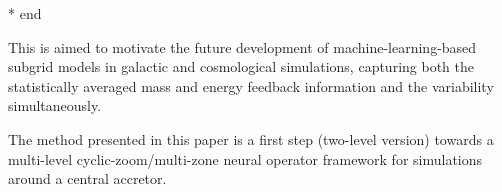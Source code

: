 \documentclass{article}
\newcommand{\hywcom}[1]{{\color{purple}{[HYW: #1]}}}
\begin{document}
* end

This is aimed to motivate the future development of machine-learning-based subgrid models in galactic and cosmological simulations, capturing both the statistically averaged mass and energy feedback information and the variability simultaneously.

\hywcom{Future Prospective.}
The method presented in this paper is a first step (two-level version) towards a multi-level cyclic-zoom/multi-zone neural operator framework for simulations around a central accretor.






\end{document}
